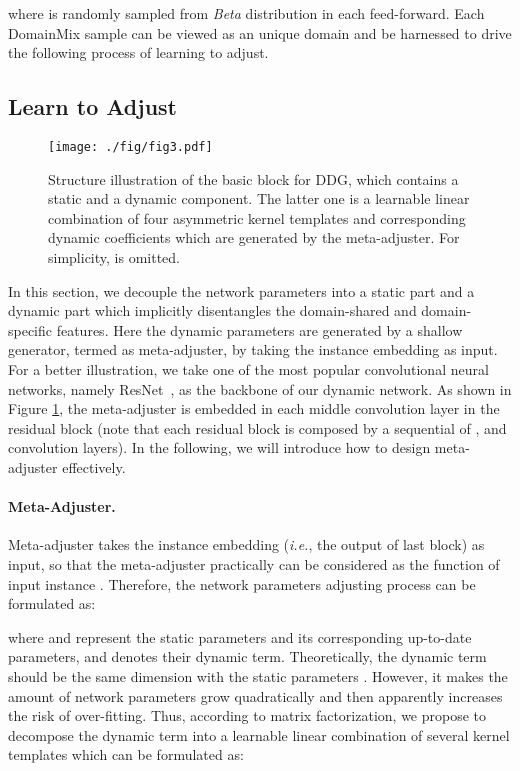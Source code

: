 \documentclass{article}
\begin{document}
where  is randomly sampled from \emph{Beta} distribution in each feed-forward. Each DomainMix sample  can be viewed as an unique domain and be harnessed to drive the following process of learning to adjust.


\subsection{Learn to Adjust}
\begin{figure}[t]
\centering
\texttt{[image: ./fig/fig3.pdf]}
\caption{Structure illustration of the basic block for DDG, which contains a static and a dynamic component. The latter one is a learnable linear combination of four asymmetric kernel templates and corresponding dynamic coefficients which are generated by the meta-adjuster. For simplicity,  is omitted.}
\label{fig:block}
\end{figure}

In this section, we decouple the network parameters into a static part and a dynamic part which implicitly disentangles the domain-shared and domain-specific features. Here the dynamic parameters are generated by a shallow generator, termed as meta-adjuster, by taking the instance embedding as input. For a better illustration, we take one of the most popular convolutional neural networks, namely ResNet~\cite{resnet}, as the backbone of our dynamic network. As shown in Figure \ref{fig:block}, the meta-adjuster is embedded in each middle convolution layer in the residual block (note that each residual block is composed by a sequential of ,  and  convolution layers). In the following, we will introduce how to design meta-adjuster effectively.





\paragraph{Meta-Adjuster.}
Meta-adjuster takes the instance embedding  (\emph{i.e.}, the output of last block) as input, so that the meta-adjuster practically can be considered as the function of input instance . Therefore, the network parameters adjusting process can be formulated as:

where  and  represent the static parameters and its corresponding up-to-date parameters, and  denotes their dynamic term. Theoretically, the dynamic term  should be the same dimension with the static parameters . However, it makes the amount of network parameters grow quadratically and then apparently increases the risk of over-fitting. Thus, according to matrix factorization, we propose to decompose the dynamic term into a learnable linear combination of several kernel templates  which can be formulated as:
\end{document}
